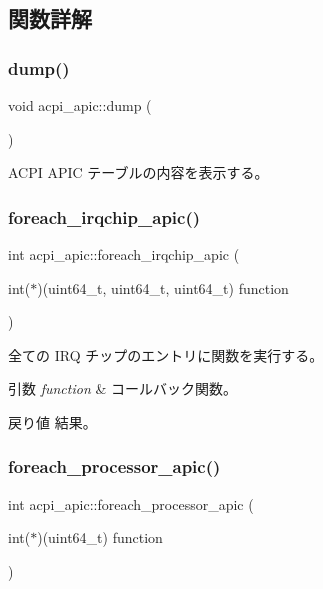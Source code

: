 \subsection{関数詳解}
\hypertarget{classacpi__apic_a91ad1b58ee35b7efaee43b00c1816877}{}\label{classacpi__apic_a91ad1b58ee35b7efaee43b00c1816877} 
\subsubsection{\texorpdfstring{dump()}{dump()}}
{\footnotesize\ttfamily void acpi\+\_\+apic\+::dump (\begin{DoxyParamCaption}{ }\end{DoxyParamCaption})}

A\+C\+PI A\+P\+IC テーブルの内容を表示する。 \hypertarget{classacpi__apic_a5790b7de6edd98af4e499e048dda62a4}{}\label{classacpi__apic_a5790b7de6edd98af4e499e048dda62a4} 
\subsubsection{\texorpdfstring{foreach\+\_\+irqchip\+\_\+apic()}{foreach\_irqchip\_apic()}}
{\footnotesize\ttfamily int acpi\+\_\+apic\+::foreach\+\_\+irqchip\+\_\+apic (\begin{DoxyParamCaption}\item[{int($\ast$)(uint64\+\_\+t, uint64\+\_\+t, uint64\+\_\+t)}]{function }\end{DoxyParamCaption})}

全ての I\+RQ チップのエントリに関数を実行する。 
\begin{DoxyParams}{引数}
{\em function} & コールバック関数。 \\
\hline
\end{DoxyParams}
\begin{DoxyReturn}{戻り値}
結果。 
\end{DoxyReturn}
\hypertarget{classacpi__apic_a54cec0a38788cb5df1544ad5ed412e8c}{}\label{classacpi__apic_a54cec0a38788cb5df1544ad5ed412e8c} 
\subsubsection{\texorpdfstring{foreach\+\_\+processor\+\_\+apic()}{foreach\_processor\_apic()}}
{\footnotesize\ttfamily int acpi\+\_\+apic\+::foreach\+\_\+processor\+\_\+apic (\begin{DoxyParamCaption}\item[{int($\ast$)(uint64\+\_\+t)}]{function }\end{DoxyParamCaption})}

